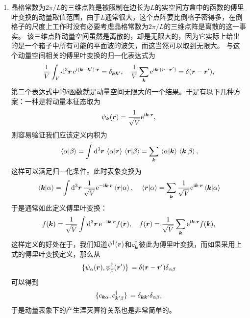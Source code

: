 \begin{enumerate}
    \item 晶格常数为$2\pi / L$的三维点阵是被限制在边长为$L$的实空间方盒中的函数的傅里叶变换的动量取值范围，由于$L$通常很大，这个点阵要比倒格子密得多，在倒格子的尺度上工作时没有必要考虑晶格常数为$2\pi / L$的三维点阵是离散的这一事实。
    该三维点阵动量空间虽然是离散的，却是无限大的，因为它实际上给出的是一个箱子中所有可能的平面波的波矢，而这当然可以取到无限大。
    与这个动量空间相关的傅里叶变换的归一化表达式为
    \begin{equation}
        \frac{1}{V} \int_V \dd[3]{\vb*{r}} \mathrm{e}^{\mathrm{i} (\vb*{k} - \vb*{k}') \cdot \vb*{r}} = \delta_{\vb*{k} \vb*{k}'}, \quad \frac{1}{V} \sum_{\vb*{k}} \mathrm{e}^{\mathrm{i} \vb*{k} \cdot (\vb*{r} - \vb*{r}')} = \delta(\vb*{r} - \vb*{r}'),
    \end{equation}
    第二个表达式中的$\delta$函数就是动量空间无限大的一个结果。于是有以下几种方案：一种是将动量本征态取为
    \begin{equation}
        \psi_{\vb*{k}}(\vb*{r}) = \frac{1}{\sqrt{V}} \mathrm{e}^{\mathrm{i} \vb*{k} \cdot \vb*{r}},
    \end{equation}
    则容易验证我们应该定义内积为
    \begin{equation}
        \braket*{\alpha}{\beta} = \int \dd[3]{\vb*{r}} \braket*{\alpha}{\vb*{r}} \braket*{\vb*{r}}{\beta} = \sum_{\vb*{k}} \braket*{\alpha}{\vb*{k}} \braket*{\vb*{k}}{\beta},
        \label{eq:integrate-ouver-whole-space}
    \end{equation}
    这样可以满足归一化条件。此时表象变换为
    \[
        \braket*{\vb*{k}}{\alpha} = \int \dd[3]{\vb*{r}} \frac{1}{\sqrt{V}} \mathrm{e}^{- \mathrm{i} \vb*{k} \cdot \vb*{r}} \braket*{\vb*{r}}{\alpha}, \quad \braket*{\vb*{r}}{\alpha} = \sum_{\vb*{k}} \frac{1}{\sqrt{V}} \mathrm{e}^{ \mathrm{i} \vb*{k} \cdot \vb*{r}} \braket*{\vb*{k}}{\alpha}
    \]
    于是通常如此定义傅里叶变换：
    \begin{equation}
        f(\vb*{k}) = \frac{1}{\sqrt{V}} \int \dd[3]{\vb*{r}} \mathrm{e}^{- \mathrm{i} \vb*{k} \cdot \vb*{r}} f(\vb*{r}), \quad f(\vb*{r}) = \frac{1}{\sqrt{V}} \sum_{\vb*{k}} \mathrm{e}^{\mathrm{i} \vb*{k} \cdot \vb*{r}} f(\vb*{k}),
        \label{eq:sqrt-v-rep}
    \end{equation}
    这样定义的好处在于，我们知道${\psi}^\dagger(\vb*{r})$和${c}^\dagger_{\vb*{k}}$彼此为傅里叶变换，而如果采用上式的傅里叶变换定义，那么从
    \[
        \acomm*{{\psi}_\alpha(\vb*{r})}{{\psi}^\dagger_\beta(\vb*{r}')} = \delta(\vb*{r}-\vb*{r}') \delta_{\alpha \beta}
    \]
    可以得到
    \[
        \acomm*{{c}_{\vb*{k}\alpha}}{{c}^\dagger_{\vb*{k}' \beta}} = \delta_{\vb*{k} \vb*{k}'} \delta_{\alpha \beta},
    \]
    于是动量表象下的产生湮灭算符关系也是非常简单的。
    

\end{enumerate}
